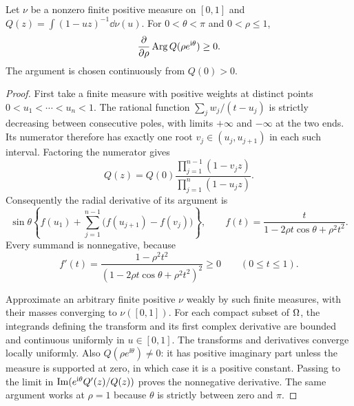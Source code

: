 \begin{lemma}
\label{ado:lem:radialPick}
Let $\nu$ be a nonzero finite positive measure on $[0,1]$ and
$Q(z)=\int(1-uz)^{-1}\dd\nu(u)$. For $0<\theta<\pi$ and
$0<\rho\le1$,
\begin{equation}\label{ado:eq:radialPick}
 \frac{\partial}{\partial\rho}\operatorname{Arg} Q(\rho e^{\mathrm i\theta})\ge0.
\end{equation}
The argument is chosen continuously from $Q(0)>0$.
\end{lemma}
\begin{proof}
First take a finite measure with positive weights at distinct points
$0<u_1<\cdots<u_n<1$. The rational function
$\sum_j w_j/(t-u_j)$ is strictly decreasing between consecutive poles,
with limits $+\infty$ and $-\infty$ at the two ends. Its numerator
therefore has exactly one root $v_j\in(u_j,u_{j+1})$ in each such
interval. Factoring the numerator gives
\[
 Q(z)=Q(0)\frac{\prod_{j=1}^{n-1}(1-v_jz)}
                      {\prod_{j=1}^n(1-u_jz)}.
\]
Consequently the radial derivative of its argument is
\[
 \sin\theta\left\{f(u_1)+
          \sum_{j=1}^{n-1}\bigl(f(u_{j+1})-f(v_j)\bigr)\right\},
 \qquad f(t)=\frac{t}{1-2\rho t\cos\theta+\rho^2t^2}.
\]
Every summand is nonnegative, because
\[
 f'(t)=\frac{1-\rho^2t^2}
            {(1-2\rho t\cos\theta+\rho^2t^2)^2}\ge0
 \qquad(0\le t\le1).
\]

Approximate an arbitrary finite positive $\nu$ weakly by such finite
measures, with their masses converging to $\nu([0,1])$. For each
compact subset of $\Omega$, the integrands defining the transform and
its first complex derivative are bounded and continuous uniformly in
$u\in[0,1]$. The transforms and derivatives converge locally uniformly.
Also $Q(\rho e^{\ii\theta})\ne0$: it has positive imaginary part
unless the measure is supported at zero, in which case it is a positive
constant. Passing to the limit in
$\operatorname{Im}(e^{\mathrm i\theta}Q'(z)/Q(z))$ proves the nonnegative derivative.
The same argument works at $\rho=1$ because $\theta$ is strictly
between zero and $\pi$.
\end{proof}

